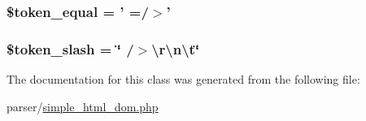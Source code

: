 \hypertarget{classsimple__html__dom_a554179de2a5fb6395ce5ec3ff38f3169}{
\subsubsection[{\$token\+\_\+equal}]{\setlength{\rightskip}{0pt plus 5cm}\$token\+\_\+equal = ' =/$>$'\hspace{0.3cm}{\ttfamily [protected]}}}\label{classsimple__html__dom_a554179de2a5fb6395ce5ec3ff38f3169}
\hypertarget{classsimple__html__dom_a6e9298d28dc391aa70939916476fd4d1}{
\subsubsection[{\$token\+\_\+slash}]{\setlength{\rightskip}{0pt plus 5cm}\$token\+\_\+slash = \char`\"{} /$>$\textbackslash{}r\textbackslash{}n\textbackslash{}t\char`\"{}\hspace{0.3cm}{\ttfamily [protected]}}}\label{classsimple__html__dom_a6e9298d28dc391aa70939916476fd4d1}


The documentation for this class was generated from the following file\+:\begin{DoxyCompactItemize}
\item 
parser/\hyperlink{simple__html__dom_8php}{simple\+\_\+html\+\_\+dom.\+php}\end{DoxyCompactItemize}

